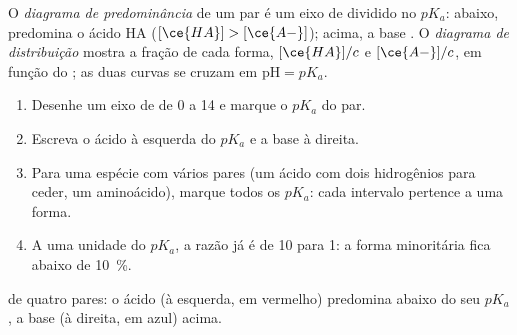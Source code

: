 \begin{definition}\label{def:g12:buffers-predominance:predominance}
O \emph{diagrama de predominância} de um
par é um eixo de  dividido no $pK_a$: abaixo, predomina o ácido HA
($[\ce{HA}] > [\ce{A-}]$); acima, a base . O \emph{diagrama de
distribuição} mostra a fração de cada
forma, $[\ce{HA}]/c$ e $[\ce{A-}]/c$, em função do ; as duas curvas se
cruzam em $\mathrm{pH} = pK_a$.
\end{definition}

\begin{method}\label{met:g12:buffers-predominance:diagram}
\begin{enumerate}
  \item Desenhe um eixo de  de 0 a 14 e marque o $pK_a$ do par.
  \item Escreva o ácido à esquerda do $pK_a$ e a base à direita.
  \item Para uma espécie com vários pares (um ácido com dois hidrogênios
        para ceder, um aminoácido), marque todos os $pK_a$: cada
        intervalo pertence a uma forma.
  \item A uma unidade do $pK_a$, a razão já é de 10 para 1: a forma
        minoritária fica abaixo de \qty{10}{\percent}.
\end{enumerate}
\end{method}

\begin{omfigure}

{\small {} de quatro pares: o ácido (à esquerda,
em vermelho) predomina abaixo do seu $pK_a$, a base (à direita, em azul)
acima.}
\end{omfigure}

